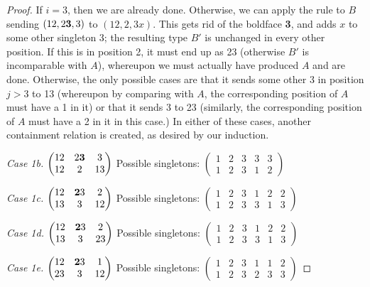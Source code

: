 \documentclass[11pt]{amsart}
\begin{document}
\begin{proof}
If $i=3$, then we are already done. Otherwise, we can apply the rule to $B$ sending $(12, 2{\bf 3}, 3)$ to 
$(12, 2, 3x)$. This gets rid of the boldface {\bf 3}, 
and adds $x$ to some other singleton 3; the resulting type $B'$ is unchanged in every other position. If this is in position 2, it must end up as 23 
(otherwise $B'$ is incomparable with $A$), whereupon we must actually have produced $A$ and are done. Otherwise, the only possible cases are that it 
sends some other 3 in position $j>3$ to 13 (whereupon by comparing with $A$, the corresponding position of $A$ must have a 1 in it) or that it 
sends 3 to 23 (similarly, the corresponding position of $A$ must have a 2 in it in this case.) In either of these cases, another containment 
relation is created, as desired by our induction.

\textit{Case 1b.}
$\begin{pmatrix}
12 & 2{\bf 3} & 3 \\
12 & 2 & 13 
\end{pmatrix}$
Possible singletons: 
$\begin{pmatrix}
1 & 2 & 3 & 3 & 3 \\
1 & 2 & 3 & 1 & 2 
\end{pmatrix}$

\textit{Case 1c.}
$\begin{pmatrix}
12 & {\bf 2}3 & 2 \\
13 & 3 & 12 
\end{pmatrix}$
Possible singletons: 
$\begin{pmatrix}
1 & 2 & 3 & 1 & 2 & 2\\
1 & 2 & 3 & 3 & 1 & 3
\end{pmatrix}$

\textit{Case 1d.}
$\begin{pmatrix}
12 & {\bf 2}3 & 2 \\
13 & 3 & 23 
\end{pmatrix}$
Possible singletons: 
$\begin{pmatrix}
1 & 2 & 3 & 1 & 2 & 2\\
1 & 2 & 3 & 3 & 1 & 3
\end{pmatrix}$

\textit{Case 1e.}
$\begin{pmatrix}
12 & {\bf 2}3 & 1 \\
23 & 3 & 12 
\end{pmatrix}$
Possible singletons: 
$\begin{pmatrix}
1 & 2 & 3 & 1 & 1 & 2\\
1 & 2 & 3 & 2 & 3 & 3
\end{pmatrix}$


\end{proof}
\end{document}
